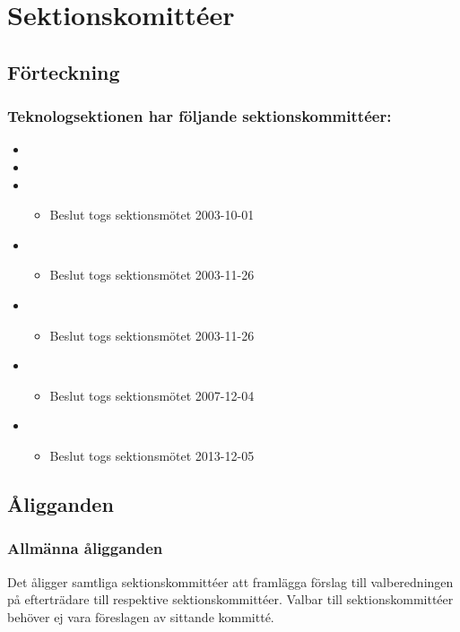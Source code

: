 \section{Sektionskomittéer}

\subsection{Förteckning}

\subsubsection{Teknologsektionen har följande sektionskommittéer:}

\begin{itemize}
	\item \SEXITFULL
	\item \NOLLKITFULL
	\item \PRITFULL
	\begin{itemize}
		\item Beslut togs sektionsmötet 2003-10-01
	\end{itemize}
	\item \FRITIDFULL
	\begin{itemize}
		\item Beslut togs sektionsmötet 2003-11-26
	\end{itemize}
	\item \ARMITFULL
	\begin{itemize}
		\item Beslut togs sektionsmötet 2003-11-26
	\end{itemize}
	\item \DIGITFULL
	\begin{itemize}
		\item Beslut togs sektionsmötet 2007-12-04 
	\end{itemize}
	\item \FANBARERITFULL
	\begin{itemize}
		\item Beslut togs sektionsmötet 2013-12-05 
	\end{itemize}

\end{itemize}

\subsection{Åligganden}
\subsubsection{Allmänna åligganden}
Det åligger samtliga sektionskommittéer att framlägga förslag till valberedningen på efterträdare till respektive sektionskommittéer. Valbar till sektionskommittéer behöver ej vara föreslagen av sittande kommitté.

\newpage

\newpage

\newpage

\newpage

\newpage

\newpage

\newpage

